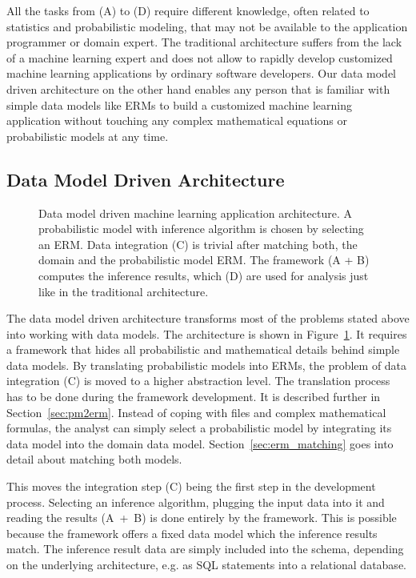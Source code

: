 All the tasks from (A) to (D) require different knowledge, often related to statistics and probabilistic modeling, that may not be available to the application programmer or domain expert. The traditional architecture suffers from the lack of a machine learning expert and does not allow to rapidly develop customized machine learning applications by ordinary software developers. Our data model driven architecture on the other hand enables any person that is familiar with simple data models like ERMs to build a customized machine learning application without touching any complex mathematical equations or probabilistic models at any time.

\newpage %

\subsection{Data Model Driven Architecture}

\begin{figure}
\centering
\scalebox{\tikzScale}{\adjustTikzSize }
\caption[Data model driven machine learning application architecture]{Data model driven machine learning application architecture. A probabilistic model with inference algorithm is chosen by selecting an ERM. Data integration (C) is trivial after matching both, the domain and the probabilistic model ERM. The framework (A + B) computes the inference results, which (D) are used for analysis just like in the traditional architecture.}\label{fig:ml-application-architecture-dm}
\end{figure}

The data model driven architecture transforms most of the problems stated above into working with data models. The architecture is shown in Figure~\ref{fig:ml-application-architecture-dm}. It requires a framework that hides all probabilistic and mathematical details behind simple data models. By translating probabilistic models into ERMs, the problem of data integration (C) is moved to a higher abstraction level. The translation process has to be done during the framework development. It is described further in Section~\ref{sec:pm2erm}. Instead of coping with files and complex mathematical formulas, the analyst can simply select a probabilistic model by integrating its data model into the domain data model. Section~\ref{sec:erm_matching} goes into detail about matching both models.

This moves the integration step (C) being the first step in the development process. Selecting an inference algorithm, plugging the input data into it and reading the results (A~+~B) is done entirely by the framework. This is possible because the framework offers a fixed data model which the inference results match. The inference result data are simply included into the schema, depending on the underlying architecture, e.g. as SQL statements into a relational database.

